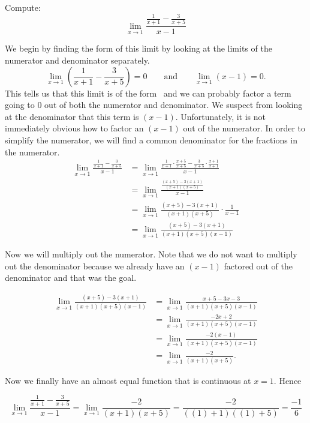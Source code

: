 \documentclass{ximera}
\begin{document}
\begin{example}
  Compute:
  \[
  \lim_{x\to 1} \frac{\frac{1}{x+1}-\frac{3}{x+5}}{x-1}
  \]
\begin{explanation}
  We begin by finding the form of this limit by looking at the limits
  of the numerator and denominator separately.
  \[
  \lim_{x\to 1}\left(\frac{1}{x+1}-\frac{3}{x+5}\right)=0\qquad\text{and}\qquad\lim_{x\to 1}\left(x-1\right)=0.
  \]
This tells us that this limit is of the form \zeroOverZero\ and we can
probably factor a term going to $0$ out of both the numerator and
denominator.  We suspect from looking at the denominator that this
term is $(x-1)$.  Unfortunately, it is not immediately obvious how to
factor an $(x-1)$ out of the numerator.  In order to simplify the
numerator, we will find a common denominator for the fractions in the
numerator.
\begin{align*}
\lim_{x\to 1} \frac{\frac{1}{x+1}-\frac{3}{x+5}}{x-1}  &= \lim_{x\to 1} \frac{\frac{1}{x+1} \cdot \frac{x+5}{x+5}-\frac{3}{x+5} \cdot \frac{x+1}{x+1}}{x-1}\\
&= \lim_{x\to 1} \frac{\frac{(x+5)-3(x+1)}{(x+1)(x+5)}}{x-1}\\
&= \lim_{x\to 1}\frac{(x+5)-3(x+1)}{(x+1)(x+5)} \cdot \frac{1}{x-1}\\
&= \lim_{x\to 1}\frac{(x+5)-3(x+1)}{(x+1)(x+5)(x-1)}
\end{align*}

Now we will multiply out the numerator.  Note that we do not want to
multiply out the denominator because we already have an $(x-1)$
factored out of the denominator and that was the goal.

\begin{align*}
\lim_{x\to 1}\frac{(x+5)-3(x+1)}{(x+1)(x+5)(x-1)} &= \lim_{x\to 1}\frac{x+5-3x-3}{(x+1)(x+5)(x-1)} \\
&= \lim_{x\to 1}\frac{-2x+2}{(x+1)(x+5)(x-1)}\\
&= \lim_{x\to 1}\frac{-2(x-1)}{(x+1)(x+5)(x-1)}\\
&= \lim_{x\to 1}\frac{-2}{(x+1)(x+5)}.
\end{align*}
  
Now we finally have an almost equal function that is continuous at
$x=1$. Hence

\[
\lim_{x\to 1} \frac{\frac{1}{x+1}-\frac{3}{x+5}}{x-1}=\lim_{x\to 1}\frac{-2}{(x+1)(x+5)} = \frac{-2}{((1)+1)((1)+5)} = \frac{-1}{6}
\]
\end{explanation}
\end{example}
\end{document}
